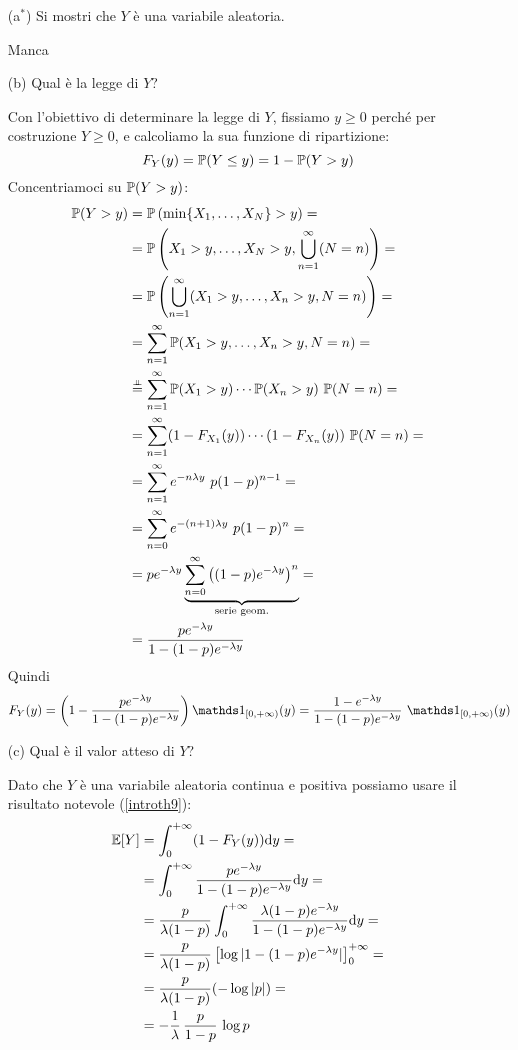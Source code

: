 \Soluzione{}
\begin{enumerate}
\item [(a$^*$)] Si mostri che $Y$ è una variabile aleatoria.

Manca %

\item [(b)] Qual è la legge di $Y$?

Con l'obiettivo di determinare la legge di $Y$, fissiamo $y\geq 0$ perché per costruzione $Y\geq 0$, e calcoliamo la sua funzione di ripartizione:
\[
F_Y(y)=\mathbb{P}(Y\leq y)=1-\mathbb{P}(Y>y)
\]
Concentriamoci su $\mathbb{P}(Y>y)$:
\begin{gather*}
\begin{aligned}
\mathbb{P}(Y>y)&=\mathbb{P}\left(\min\{X_1,\dots,X_N  \}>y  \right)=\\
&=\mathbb{P}\left(X_1>y,\dots,X_N>y,\bigcup_{n=1}^\infty (N=n)  \right)=\\
&=\mathbb{P}\left(\bigcup_{n=1}^\infty(X_1>y,\dots,X_n>y, N=n)  \right)=\\
&=\sum_{n=1}^\infty \mathbb{P}(X_1>y,\dots,X_n>y, N=n)=\\
&\overset{\underset{\perp \!\!\! \perp}{}}{=}\sum_{n=1}^\infty \mathbb{P}(X_1>y)\cdots\mathbb{P}(X_n>y)\ \mathbb{P}(N=n)=\\
&=\sum_{n=1}^\infty (1-F_{X_1}(y))\cdots (1-F_{X_n}(y))\ \mathbb{P}(N=n)=\\
&=\sum_{n=1}^\infty e^{-n\lambda y}\ p(1-p)^{n-1}=\\
&=\sum_{n=0}^\infty e^{-(n+1)\lambda y}\ p(1-p)^{n}=\\
&=pe^{-\lambda y} \underbrace{\sum_{n=0}^\infty \left((1-p)e^{-\lambda y}  \right)^n}_{\text{serie geom.}}=\\
&=\frac{pe^{-\lambda y}}{1-(1-p)e^{-\lambda y}}
\end{aligned}
\end{gather*}
Quindi
\[
F_Y(y)=\left(1-\frac{pe^{-\lambda y}}{1-(1-p)e^{-\lambda y}}  \right)\Ind_{[0,+\infty)}(y)=\frac{1-e^{-\lambda y}}{1-(1-p)e^{-\lambda y}}\ \Ind_{[0,+\infty)}(y)
\]

\item [(c)] Qual è il valor atteso di $Y$? 

Dato che $Y$ è una variabile aleatoria continua e positiva possiamo usare il risultato notevole (\ref{introth9}):
\begin{gather*}
\begin{aligned}
\mathbb{E}[Y]&=\int_0^{+\infty}(1-F_Y(y))\mathrm{d} y=\\
&=\int_{0}^{+\infty} \frac{pe^{-\lambda y}}{1-(1-p)e^{-\lambda y}}\mathrm{d} y=\\
&=\frac{p}{\lambda(1-p)}\int_{0}^{+\infty} \frac{\lambda(1-p)e^{-\lambda y}}{1-(1-p)e^{-\lambda y}}\mathrm{d} y=\\
&=\frac{p}{\lambda(1-p)}\left[\log |1-(1-p)e^{-\lambda y}|  \right]_0^{+\infty}=\\
&=\frac{p}{\lambda(1-p)}(-\log |p|)=\\
&=-\frac{1}{\lambda}\, \frac{p}{1-p}\, \log p
\end{aligned}
\end{gather*}

\end{enumerate}

